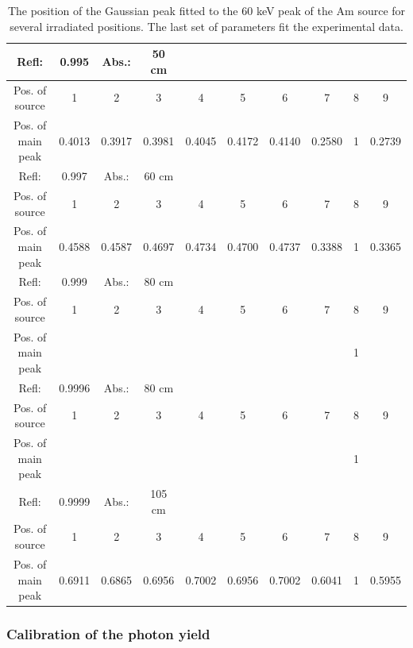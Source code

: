 \documentclass[12pt, a4paper,titlepage]{article}
\numberwithin{equation}{section}
\numberwithin{figure}{section}
\begin{document}
\begin{center}

\begin{table}[h!]
\begin{tabular}{ |c|c|c|c|c|c|c|c|c|c| } 
\hline
Refl:& 0.995 & Abs.:& 50 cm   &  &  &  &  &  &  \\ 
\hline
 Pos. of source & 1 & 2 & 3 & 4 & 5 & 6 & 7 & 8 & 9 \\ 
 Pos. of main peak & 0.4013 & 0.3917 & 0.3981 & 0.4045 & 0.4172 & 0.4140 & 0.2580 & 1 & 0.2739\\ 
 \hline   
\hline
 Refl:& 0.997 & Abs.:& 60 cm   &  &  &  &  &  &  \\ 
 \hline
  Pos. of source & 1 & 2 & 3 & 4 & 5 & 6 & 7 & 8 & 9 \\ 
  Pos. of main peak & 0.4588 & 0.4587 & 0.4697 & 0.4734 & 0.4700 & 0.4737 & 0.3388 & 1 & 0.3365  \\ 
 \hline \hline
Refl:& 0.999 & Abs.:& 80 cm   &  &  &  &  &  &  \\ 
 \hline
  Pos. of source & 1 & 2 & 3 & 4 & 5 & 6 & 7 & 8 & 9 \\ 
  Pos. of main peak &  &  &  &  &  &  &  & 1 &   \\ 
 \hline \hline
Refl:& 0.9996 & Abs.:& 80 cm   &  &  &  &  &  &  \\ 
 \hline
  Pos. of source & 1 & 2 & 3 & 4 & 5 & 6 & 7 & 8 & 9 \\ 
  Pos. of main peak &  &  &  &  &  &  &  & 1 &  \\ 
  \hline \hline
Refl:& 0.9999 & Abs.:& 105 cm   &  &  &  &  &  &  \\ 
 \hline
  Pos. of source & 1 & 2 & 3 & 4 & 5 & 6 & 7 & 8 & 9 \\ 
  Pos. of main peak & 0.6911 & 0.6865 & 0.6956 & 0.7002 & 0.6956 & 0.7002 & 0.6041 & 1 & 0.5955 \\ 
  \hline
\end{tabular}
 \caption{The position of the Gaussian peak fitted to the 60 keV peak of the Am source for several irradiated positions. The last set of parameters fit the experimental data.}
 \label{tabl:simulated}
\end{table}
\end{center}

\subsubsection{Calibration of the photon yield}
\end{document}

